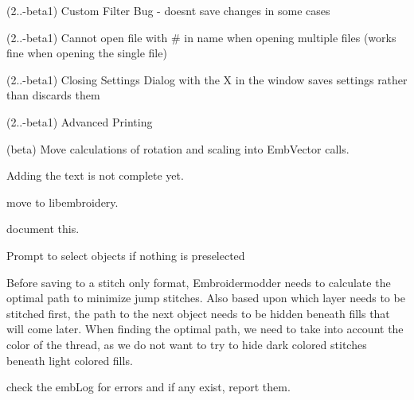 \begin{DoxyRefList}
\label{todo__todo000254}%
%
(2..-\/beta1) Custom Filter Bug -\/ doesn\textquotesingle{}t save changes in some cases

\label{todo__todo000255}%
%
(2..-\/beta1) Cannot open file with {\ttfamily \#} in name when opening multiple files (works fine when opening the single file)

\label{todo__todo000256}%
%
(2..-\/beta1) Closing Settings Dialog with the X in the window saves settings rather than discards them

\label{todo__todo000257}%
%
(2..-\/beta1) Advanced Printing

\label{todo__todo000381}%
%
(beta) Move calculations of rotation and scaling into {\ttfamily Emb\+Vector} calls. 
\item[Global \mbox{\hyperlink{src_2main_8c_aa963018f80feb78d794c2980576edcc9}{quickleader\+\_\+main}} (void)]\label{todo__todo000226}%
%
Adding the text is not complete yet. 
\item[Global \mbox{\hyperlink{src_2main_8c_abf62628119dde9fd93f65be6742e2b22}{random\+\_\+uniform}} (void)]\label{todo__todo000007}%
%
move to libembroidery. 
\item[Global \mbox{\hyperlink{src_2main_8c_af79e738d67fcf5da0a50d6ea559d3b32}{RGB\+\_\+\+MODE\+\_\+\+BACKGROUND}} ]\label{todo__todo000227}%
%
document this.  
\item[Global \mbox{\hyperlink{src_2main_8c_a644510fd1fda113a92ff678338657074}{rotate\+\_\+main}} (void)]\label{todo__todo000228}%
%
Prompt to select objects if nothing is preselected  
\item[Global \mbox{\hyperlink{src_2main_8c_ab7315b158db533fb73b44c2cbfe3c394}{save\+\_\+save}} (const char $\ast$file\+Name)]\label{todo__todo000219}%
%
Before saving to a stitch only format, Embroidermodder needs to calculate the optimal path to minimize jump stitches. Also based upon which layer needs to be stitched first, the path to the next object needs to be hidden beneath fills that will come later. When finding the optimal path, we need to take into account the color of the thread, as we do not want to try to hide dark colored stitches beneath light colored fills.

\label{todo__todo000222}%
%
check the emb\+Log for errors and if any exist, report them. 


\end{DoxyRefList}
